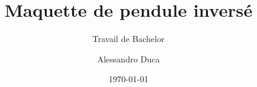 \author{Alessandro Duca}


\title{Maquette de pendule inversé}

\subtitle{Travail de Bachelor}


\date{\today}


